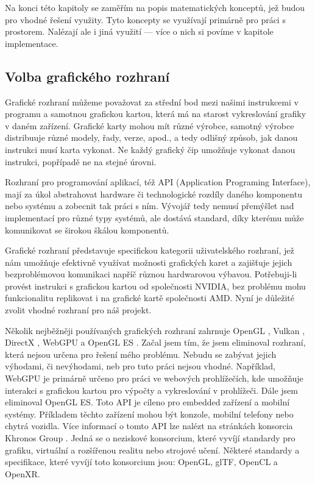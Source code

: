 \documentclass[12pt]{article}
\begin{document}
Na konci této kapitoly se zaměřím na popis matematických konceptů, jež budou pro vhodné řešení využity. Tyto koncepty se využívají primárně pro práci s prostorem. Nalézají ale i jiná využití — více o nich si povíme v kapitole implementace.

\subsection{Volba grafického rozhraní} \label{g_interface}

Grafické rozhraní můžeme považovat za střední bod mezi našimi instrukcemi v programu a samotnou grafickou kartou, která má na starost vykreslování grafiky v daném zařízení. Grafické karty mohou mít různé výrobce, samotný výrobce distribuuje různé modely, řady, verze, apod., a tedy odlišný způsob, jak danou instrukci musí karta vykonat. Ne každý grafický čip umožňuje vykonat danou instrukci, popřípadě ne na stejné úrovni.

Rozhraní pro programování aplikací, též API (Application Programing Interface), mají za úkol abstrahovat hardware či technologické rozdíly daného komponentu nebo systému a zobecnit tak práci s ním. Vývojář tedy nemusí přemýšlet nad implementací pro různé typy systémů, ale dostává standard, díky kterému může komunikovat se širokou škálou komponentů.

Grafické rozhraní představuje specifickou kategorii uživatelského rozhraní, jež nám umožňuje efektivně využívat možnosti grafických karet a zajišťuje jejich bezproblémovou komunikaci napříč různou hardwarovou výbavou. Potřebuji-li provést instrukci s grafickou kartou od společnosti NVIDIA, bez problému mohu funkcionalitu replikovat i na grafické kartě společnosti AMD. Nyní je důležité zvolit vhodné rozhraní pro náš projekt.

Několik nejběžněji používaných grafických rozhraní zahrnuje OpenGL \cite{opengl}, Vulkan \cite{vulkan}, DirectX \cite{directx}, WebGPU \cite{webgpu} a OpenGL ES \cite{opengles}. Začal jsem tím, že jsem eliminoval rozhraní, která nejsou určena pro řešení mého problému. Nebudu se zabývat jejich výhodami, či nevýhodami, neb pro tuto práci nejsou vhodné. Například, WebGPU je primárně určeno pro práci ve webových prohlížečích, kde umožňuje interakci s grafickou kartou pro výpočty a vykreslování v prohlížeči. Dále jsem eliminoval OpenGL ES. Toto API je cíleno pro embedded zařízení a mobilní systémy. Příkladem těchto zařízení mohou být konzole, mobilní telefony nebo chytrá vozidla. Více informací o tomto API lze nalézt na stránkách konsorcia Khronos Group \cite{khronos}. Jedná se o neziskové konsorcium, které vyvíjí standardy pro grafiku, virtuální a rozšířenou realitu nebo strojové učení. Některé standardy a specifikace, které vyvíjí toto konsorcium jsou: OpenGL, glTF, OpenCL a OpenXR.
\end{document}
